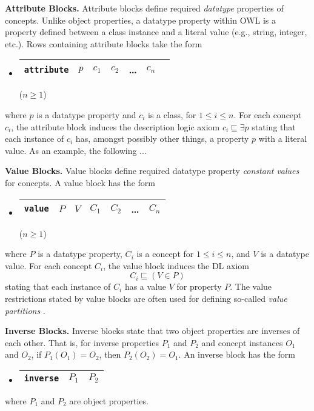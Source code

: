 \documentclass[preprint,number]{elsarticle}
\newcommand{\myblock}[1]{\vspace{12pt}\noindent\textbf{#1}}
\begin{document}
\myblock{Attribute Blocks.} Attribute blocks define required
\emph{datatype} properties of concepts. Unlike object properties, a
datatype property within OWL is a property defined between a class
instance and a literal value (e.g., string, integer, etc.). Rows
containing attribute blocks take the form
\begin{itemize}
\item[]
  \begin{tabular}{|l|l|l|l|l|l|l|}\hline \texttt{attribute} & $p$ & $c_1$
    & $c_2$ & \dots & $c_n$ \\ \hline
  \end{tabular} \hfill ($n \ge 1$)
\end{itemize}
where $p$ is a datatype property and $c_i$ is a class, for $1 \le i
\le n$. For each concept $c_i$, the attribute block induces the
description logic axiom $c_i \sqsubseteq \exists p$ stating that each
instance of $c_i$ has, amongst possibly other things, a property $p$
with a literal value. As an example, the following ...


\myblock{Value Blocks.} Value blocks define required datatype property
\emph{constant values} for concepts. A value block has the form
\begin{itemize}
\item[]
  \begin{tabular}{|l|l|l|l|l|l|l|}\hline \texttt{value} & $P$ & $V$ & $C_1$
    & $C_2$ & \dots & $C_n$ \\ \hline
  \end{tabular} \hfill ($n \ge 1$)
\end{itemize}
where $P$ is a datatype property, $C_i$ is a concept for $1 \le i \le
n$, and $V$ is a datatype value. For each concept $C_i$, the value
block induces the DL axiom \[C_i \sqsubseteq (V \in P)\] stating that
each instance of $C_i$ has a value $V$ for property $P$.  The value
restrictions stated by value blocks are often used for defining
so-called \emph{value partitions} \cite{co-ode}.


\myblock{Inverse Blocks.} Inverse blocks state that two object
properties are inverses of each other. That is, for inverse properties
$P_1$ and $P_2$ and concept instances $O_1$ and $O_2$, if $P_1(O_1) =
O_2$, then $P_2(O_2) = O_1$.  An inverse block has the form
\begin{itemize}
\item[]
  \begin{tabular}{|l|l|l|}\hline \texttt{inverse} & $P_1$ & $P_2$
\\ \hline
  \end{tabular}
\end{itemize}
where $P_1$ and $P_2$ are object properties. 
\end{document}
